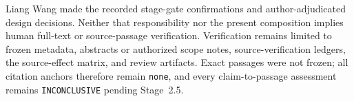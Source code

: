 \documentclass[11pt,a4paper]{article}
\begin{document}
Liang Wang made the recorded stage-gate confirmations and author-adjudicated design decisions. Neither that responsibility nor the present composition implies human full-text or source-passage verification. Verification remains limited to frozen metadata, abstracts or authorized scope notes, source-verification ledgers, the source-effect matrix, and review artifacts. Exact passages were not frozen; all citation anchors therefore remain \texttt{none}, and every claim-to-passage assessment remains \texttt{INCONCLUSIVE} pending Stage~2.5.



\end{document}
